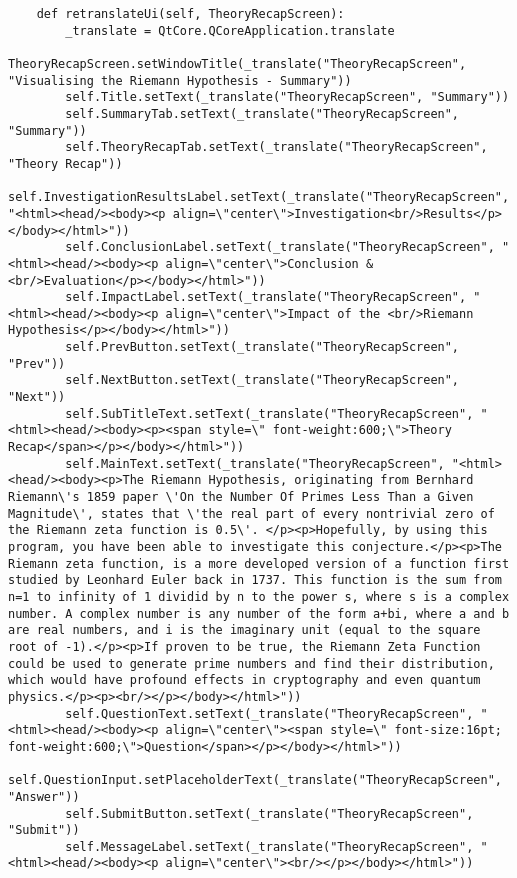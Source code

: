 \documentclass{article}
\begin{document}
\begin{lstlisting}
    def retranslateUi(self, TheoryRecapScreen):
        _translate = QtCore.QCoreApplication.translate
        TheoryRecapScreen.setWindowTitle(_translate("TheoryRecapScreen", "Visualising the Riemann Hypothesis - Summary"))
        self.Title.setText(_translate("TheoryRecapScreen", "Summary"))
        self.SummaryTab.setText(_translate("TheoryRecapScreen", "Summary"))
        self.TheoryRecapTab.setText(_translate("TheoryRecapScreen", "Theory Recap"))
        self.InvestigationResultsLabel.setText(_translate("TheoryRecapScreen", "<html><head/><body><p align=\"center\">Investigation<br/>Results</p></body></html>"))
        self.ConclusionLabel.setText(_translate("TheoryRecapScreen", "<html><head/><body><p align=\"center\">Conclusion & <br/>Evaluation</p></body></html>"))
        self.ImpactLabel.setText(_translate("TheoryRecapScreen", "<html><head/><body><p align=\"center\">Impact of the <br/>Riemann Hypothesis</p></body></html>"))
        self.PrevButton.setText(_translate("TheoryRecapScreen", "Prev"))
        self.NextButton.setText(_translate("TheoryRecapScreen", "Next"))
        self.SubTitleText.setText(_translate("TheoryRecapScreen", "<html><head/><body><p><span style=\" font-weight:600;\">Theory Recap</span></p></body></html>"))
        self.MainText.setText(_translate("TheoryRecapScreen", "<html><head/><body><p>The Riemann Hypothesis, originating from Bernhard Riemann\'s 1859 paper \'On the Number Of Primes Less Than a Given Magnitude\', states that \'the real part of every nontrivial zero of the Riemann zeta function is 0.5\'. </p><p>Hopefully, by using this program, you have been able to investigate this conjecture.</p><p>The Riemann zeta function, is a more developed version of a function first studied by Leonhard Euler back in 1737. This function is the sum from n=1 to infinity of 1 dividid by n to the power s, where s is a complex number. A complex number is any number of the form a+bi, where a and b are real numbers, and i is the imaginary unit (equal to the square root of -1).</p><p>If proven to be true, the Riemann Zeta Function could be used to generate prime numbers and find their distribution, which would have profound effects in cryptography and even quantum physics.</p><p><br/></p></body></html>"))
        self.QuestionText.setText(_translate("TheoryRecapScreen", "<html><head/><body><p align=\"center\"><span style=\" font-size:16pt; font-weight:600;\">Question</span></p></body></html>"))
        self.QuestionInput.setPlaceholderText(_translate("TheoryRecapScreen", "Answer"))
        self.SubmitButton.setText(_translate("TheoryRecapScreen", "Submit"))
        self.MessageLabel.setText(_translate("TheoryRecapScreen", "<html><head/><body><p align=\"center\"><br/></p></body></html>"))
\end{lstlisting}
\end{document}
